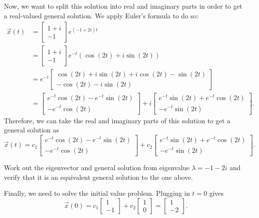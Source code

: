 \begin{exampleSol}
Now, we want to split this solution into real and imaginary parts in order to get a real-valued general solution. We apply Euler's formula to do so:
\begin{equation*}
\begin{split}
\vec{x}(t) &= \begin{bmatrix} 1+i \\ -1 \end{bmatrix} e^{(-1 + 2i)t} \\
&= \begin{bmatrix} 1+i \\ -1 \end{bmatrix} e^{-t}(\cos(2t) + i\sin(2t)) \\
&= e^{-t} \begin{bmatrix} \cos(2t) + i\sin(2t)+i\cos(2t) - \sin(2t) \\ -\cos(2t) - i\sin(2t)  \end{bmatrix} \\
&= \begin{bmatrix} e^{-t}\cos(2t) - e^{-t}\sin(2t) \\ -e^{-t}\cos(2t)\end{bmatrix} + i\begin{bmatrix} e^{-t}\sin(2t) + e^{-t}\cos(2t) \\ -e^{-t}\sin(2t) \end{bmatrix}.
\end{split}
\end{equation*}
Therefore, we can take the real and imaginary parts of this solution to get a general solution as
\begin{equation*}
\vec{x}(t) = c_1 \begin{bmatrix} e^{-t}\cos(2t) - e^{-t}\sin(2t) \\ -e^{-t}\cos(2t)\end{bmatrix} +  c_2\begin{bmatrix} e^{-t}\sin(2t) + e^{-t}\cos(2t) \\ -e^{-t}\sin(2t) \end{bmatrix}.
\end{equation*}

\begin{exercise}
Work out the eigenvector and general solution from eigenvalue $\lambda = -1 - 2i$ and verify that it is an equivalent general solution to the one above.
\end{exercise}

Finally, we need to solve the initial value problem. Plugging in $t=0$ gives 
\begin{equation*}
\vec{x}(0) = c_1 \begin{bmatrix} 1 \\ -1 \end{bmatrix} + c_2 \begin{bmatrix} 1 \\ 0 \end{bmatrix} = \begin{bmatrix} 1 \\ -2 \end{bmatrix}.
\end{equation*}


\end{exampleSol}
